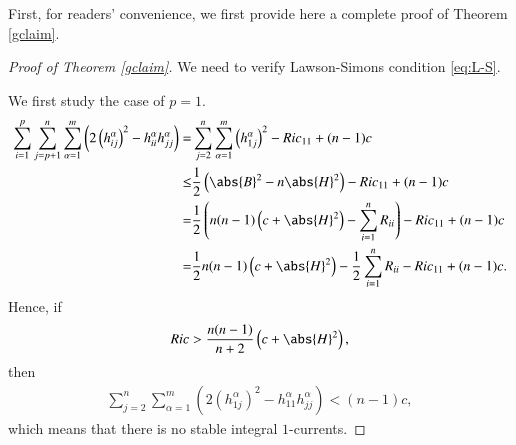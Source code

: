 \documentclass[12pt]{amsart}
\theoremstyle{plain}
\theoremstyle{remark}
\theoremstyle{definition}
\numberwithin{equation}{section}
\begin{document}
First, for readers' convenience,  we first provide here a complete proof of Theorem \ref{gclaim}.
\begin{proof}[Proof of Theorem \ref{gclaim}]
We need to verify Lawson-Simons condition \eqref{eq:L-S}.

We first study the case of $p=1$.
\begin{align*}
\sum_{i=1}^p\sum_{j=p+1}^n\sum_{\alpha=1}^m\left(2\left(h_{ij}^{\alpha}\right)^2-h_{ii}^{\alpha}h_{jj}^{\alpha}\right)=&\sum_{j=2}^n\sum_{\alpha=1}^m\left(h^{\alpha}_{1j}\right)^2-Ric_{11}+(n-1)c\\
\leq&\dfrac12\left(\abs{B}^2-n\abs{H}^2\right)-Ric_{11}+(n-1)c\\
=&\dfrac12\left(n(n-1)\left(c+\abs{H}^2\right)-\sum_{i=1}^nR_{ii}\right)-Ric_{11}+(n-1)c\\
=&\dfrac12n(n-1)\left(c+\abs{H}^2\right)-\dfrac12\sum_{i=1}^nR_{ii}-Ric_{11}+(n-1)c.
\end{align*}
Hence, if
\begin{align*}
Ric>\dfrac{n(n-1)}{n+2}\left(c+\abs{H}^2\right),
\end{align*}
then
\begin{align*}
\sum_{j=2}^n\sum_{\alpha=1}^m\left(2\left(h_{1j}^{\alpha}\right)^2-h_{11}^{\alpha}h_{jj}^{\alpha}\right)<(n-1)c,
\end{align*}
which means that there is no stable integral $1$-currents.


\end{proof}
\end{document}

